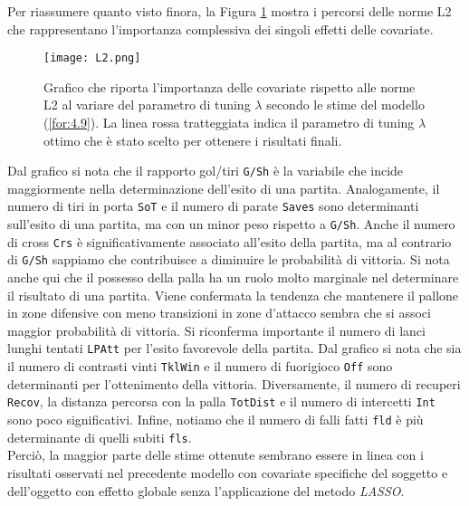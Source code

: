 Per riassumere quanto visto finora, la Figura \ref{fig:l2BTCL} mostra i percorsi delle norme L2 che rappresentano l'importanza complessiva dei singoli effetti delle covariate.
\begin{figure}[htbp]
	\begin{center}
		\texttt{[image: L2.png]}
		\caption{Grafico che riporta l'importanza delle covariate rispetto alle norme L2 al variare del parametro di tuning $\lambda$ secondo le stime del modello (\ref{for:4.9}). La linea rossa tratteggiata indica il parametro di tuning $\lambda$ ottimo che è stato scelto per ottenere i risultati finali.} \label{fig:l2BTCL}
	\end{center}
\end{figure}
Dal grafico si nota che il rapporto gol/tiri \texttt{G/Sh} è la variabile che incide maggiormente nella determinazione dell'esito di una partita. Analogamente, il numero di tiri in porta \texttt{SoT} e il numero di parate \texttt{Saves} sono determinanti sull'esito di una partita, ma con un minor peso rispetto a \texttt{G/Sh}. Anche il numero di cross \texttt{Crs} è significativamente associato all'esito della partita, ma al contrario di \texttt{G/Sh} sappiamo che contribuisce a diminuire le probabilità di vittoria. Si nota anche qui che il possesso della palla ha un ruolo molto marginale nel determinare il risultato di una partita. Viene confermata la tendenza che mantenere il pallone in zone difensive con meno transizioni in zone d'attacco sembra che si associ maggior probabilità di vittoria. Si riconferma importante il numero di lanci lunghi tentati \texttt{LPAtt} per l'esito favorevole della partita. Dal grafico si nota che sia il numero di contrasti vinti \texttt{TklWin} e il numero di fuorigioco \texttt{Off} sono determinanti per l'ottenimento della vittoria. Diversamente, il numero di recuperi \texttt{Recov}, la distanza percorsa con la palla \texttt{TotDist} e il numero di intercetti \texttt{Int} sono poco significativi. Infine, notiamo che il numero di falli fatti \texttt{fld} è più determinante di quelli subiti \texttt{fls}.\\
Perciò, la maggior parte delle stime ottenute sembrano essere in linea con i risultati osservati nel precedente modello con covariate specifiche del soggetto e dell'oggetto con effetto globale senza l'applicazione del metodo \emph{LASSO}.

